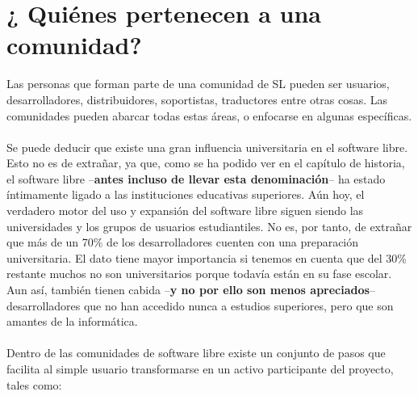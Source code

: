 \section{¿ Quiénes pertenecen a una comunidad?}

Las personas que forman parte de una comunidad de SL pueden ser usuarios, desarrolladores, distribuidores, soportistas, traductores entre otras cosas. Las comunidades pueden abarcar todas estas áreas, o enfocarse en algunas específicas.
\\
\\
Se puede deducir que existe una gran influencia universitaria en el software libre. Esto no es de extrañar, ya que, como se ha podido ver en el capítulo de historia, el software libre –{\bf antes incluso de llevar esta denominación}– ha estado íntimamente ligado a las instituciones educativas superiores. Aún hoy, el verdadero motor del uso y expansión del software libre siguen siendo las universidades y los grupos de usuarios estudiantiles. No es, por tanto, de extrañar que más de un 70\% de los desarrolladores cuenten con una preparación universitaria. El dato tiene mayor importancia si tenemos en cuenta que del 30\% restante muchos no son universitarios porque todavía están en su fase escolar. Aun así, también tienen cabida –{\bf y no por ello son menos apreciados}– desarrolladores que no han accedido nunca a estudios superiores, pero que son amantes de la informática.
\\
\\
Dentro de las comunidades de software libre existe un conjunto de pasos que facilita al simple usuario transformarse en un activo participante del proyecto, tales como: 

